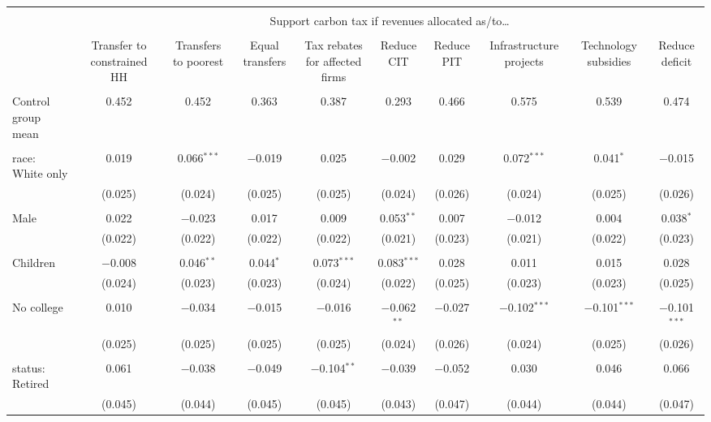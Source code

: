 
\begin{tabular}{@{\extracolsep{5pt}}lccccccccc} 
\\[-1.8ex]\hline 
\hline \\[-1.8ex] 
 & \multicolumn{9}{c}{Support carbon tax if revenues allocated as/to…} \\ 
\cline{2-10} 
\\[-1.8ex] & Transfer to constrained HH & Transfers to poorest & Equal transfers & Tax rebates for affected firms & Reduce CIT & Reduce PIT & Infrastructure projects & Technology subsidies & Reduce deficit \\ 
\hline \\[-1.8ex] 
 Control group mean & 0.452 & 0.452 & 0.363 & 0.387 & 0.293 & 0.466 & 0.575 & 0.539 & 0.474  \\ \hline \\[-1.8ex] race: White only & 0.019 & 0.066$^{***}$ & $-$0.019 & 0.025 & $-$0.002 & 0.029 & 0.072$^{***}$ & 0.041$^{*}$ & $-$0.015 \\ 
  & (0.025) & (0.024) & (0.025) & (0.025) & (0.024) & (0.026) & (0.024) & (0.025) & (0.026) \\ 
  & & & & & & & & & \\ 
 Male & 0.022 & $-$0.023 & 0.017 & 0.009 & 0.053$^{**}$ & 0.007 & $-$0.012 & 0.004 & 0.038$^{*}$ \\ 
  & (0.022) & (0.022) & (0.022) & (0.022) & (0.021) & (0.023) & (0.021) & (0.022) & (0.023) \\ 
  & & & & & & & & & \\ 
 Children & $-$0.008 & 0.046$^{**}$ & 0.044$^{*}$ & 0.073$^{***}$ & 0.083$^{***}$ & 0.028 & 0.011 & 0.015 & 0.028 \\ 
  & (0.024) & (0.023) & (0.023) & (0.024) & (0.022) & (0.025) & (0.023) & (0.023) & (0.025) \\ 
  & & & & & & & & & \\ 
 No college & 0.010 & $-$0.034 & $-$0.015 & $-$0.016 & $-$0.062$^{**}$ & $-$0.027 & $-$0.102$^{***}$ & $-$0.101$^{***}$ & $-$0.101$^{***}$ \\ 
  & (0.025) & (0.025) & (0.025) & (0.025) & (0.024) & (0.026) & (0.024) & (0.025) & (0.026) \\ 
  & & & & & & & & & \\ 
 status: Retired & 0.061 & $-$0.038 & $-$0.049 & $-$0.104$^{**}$ & $-$0.039 & $-$0.052 & 0.030 & 0.046 & 0.066 \\ 
  & (0.045) & (0.044) & (0.045) & (0.045) & (0.043) & (0.047) & (0.044) & (0.044) & (0.047) \\ 

\end{tabular}
